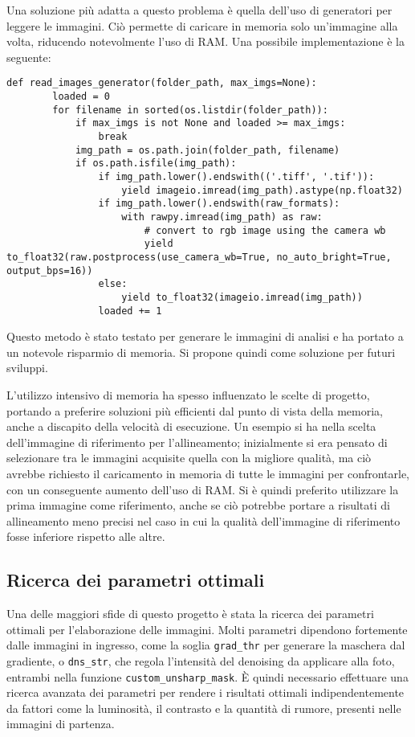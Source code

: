 Una soluzione più adatta a questo problema è quella dell'uso di generatori per leggere le immagini. Ciò permette di caricare in memoria solo un'immagine alla volta, riducendo notevolmente l'uso di RAM. Una possibile implementazione è la seguente:

\begin{lstlisting}[label={lst:image_generator}]
    def read_images_generator(folder_path, max_imgs=None):
        loaded = 0
        for filename in sorted(os.listdir(folder_path)):
            if max_imgs is not None and loaded >= max_imgs:
                break
            img_path = os.path.join(folder_path, filename)
            if os.path.isfile(img_path):
                if img_path.lower().endswith(('.tiff', '.tif')):
                    yield imageio.imread(img_path).astype(np.float32)
                if img_path.lower().endswith(raw_formats):
                    with rawpy.imread(img_path) as raw:
                        # convert to rgb image using the camera wb
                        yield to_float32(raw.postprocess(use_camera_wb=True, no_auto_bright=True, output_bps=16))
                else:
                    yield to_float32(imageio.imread(img_path))
                loaded += 1
\end{lstlisting}

Questo metodo è stato testato per generare le immagini di analisi e ha portato a un notevole risparmio di memoria. Si propone quindi come soluzione per futuri sviluppi.

L'utilizzo intensivo di memoria ha spesso influenzato le scelte di progetto, portando a preferire soluzioni più efficienti dal punto di vista della memoria, anche a discapito della velocità di esecuzione. Un esempio si ha nella scelta dell'immagine di riferimento per l'allineamento; inizialmente si era pensato di selezionare tra le immagini acquisite quella con la migliore qualità, ma ciò avrebbe richiesto il caricamento in memoria di tutte le immagini per confrontarle, con un conseguente aumento dell'uso di RAM. Si è quindi preferito utilizzare la prima immagine come riferimento, anche se ciò potrebbe portare a risultati di allineamento meno precisi nel caso in cui la qualità dell'immagine di riferimento fosse inferiore rispetto alle altre.

\subsection{Ricerca dei parametri ottimali}

Una delle maggiori sfide di questo progetto è stata la ricerca dei parametri ottimali per l'elaborazione delle immagini. Molti parametri dipendono fortemente dalle immagini in ingresso, come la soglia \texttt{grad\_thr} per generare la maschera dal gradiente, o \texttt{dns\_str}, che regola l'intensità del denoising da applicare alla foto, entrambi nella funzione \texttt{custom\_unsharp\_mask}. È quindi necessario effettuare una ricerca avanzata dei parametri per rendere i risultati ottimali indipendentemente da fattori come la luminosità, il contrasto e la quantità di rumore, presenti nelle immagini di partenza. 

